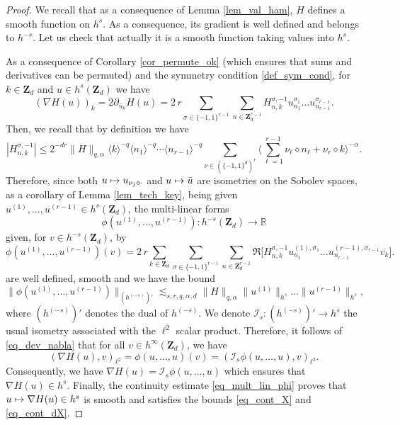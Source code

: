 \documentclass[JEP,XML,SOM,Unicode,NoEqCountersInSection,published]{cedram}
\newcommand\mto{\mathchoice{\longmapsto}{\mapsto}{\mapsto}{\mapsto}}
\theoremstyle{definition}
\begin{document}
\begin{proof} We recall that as a consequence of Lemma \ref{lem_val_ham}, $H$ defines a smooth function on $h^{s}$. As a consequence, its gradient is well defined and belongs to $h^{-s}$. Let us check that actually it is a smooth function taking values into $h^s$.

As a consequence of Corollary \ref{cor_permute_ok} (which ensures that sums and derivatives can be permuted) and the symmetry condition \eqref{def_sym_cond}, for $k\in \mathbf{Z}_d$ and $u \in h^s(\mathbf{Z}_d)$ we have
\begin{equation}
\label{eq_dev_nabla}
(\nabla H(u))_k = 2\partial_{\bar{u}_k} H(u) = 2\,r \sum_{\sigma \in \{-1,1\}^{r-1}} \sum_{n\in \mathbf{Z}_d^{r-1} } H_{n,k}^{\sigma,-1} u_{n_1}^{\sigma_1} \dots u_{n_{r-1}}^{\sigma_{r-1}}.
\end{equation}
Then, we recall that by definition we have
\[
|H_{n,k}^{\sigma,-1}| \leq 2^{-dr} \| H\|_{q,\alpha} \langle k \rangle^{-q} \langle n_1 \rangle^{-q} \cdots \langle n_{r-1} \rangle^{-q} \sum_{\nu \in (\{-1,1\}^d)^r} \biggl\langle \sum_{\ell =1}^{r-1} \nu_{\ell} \diamond n_{\ell} + \nu_{r} \diamond k \biggr\rangle^{-\alpha}.
\]
Therefore, since both $u\mto u_{\nu_j \diamond \cdot}$ and $u\mto \bar u$ are isometries on the Sobolev spaces, as a corollary of Lemma \ref{lem_tech_key}, being given $u^{(1)},\dots,u^{(r-1)}\in h^s(\mathbf{Z}_d)$, the multi-linear forms
\[
\phi(u^{(1)},\dots,u^{(r-1)}): h^{-s}(\mathbf{Z}_d) \to \mathbb{R}
\]
given, for $v\in h^{-s}(\mathbf{Z}_d)$, by
\[
\phi(u^{(1)},\dots,u^{(r-1)}) (v) = 2\,r \displaystyle \sum_{k\in \mathbf{Z}_d} \sum_{\sigma \in \{-1,1\}^{r-1}} \sum_{n\in \mathbf{Z}_d^{r-1} } \Re \bigl[H_{n,k}^{\sigma,-1} u_{n_1}^{(1),\sigma_1} \dots u_{n_{r-1}}^{(r-1),\sigma_{r-1}} \overline{v_k} \bigr].
\]
are well defined, smooth and we have the bound
\begin{equation}
\label{eq_mult_lin_phi}
\|\phi(u^{(1)},\dots,u^{(r-1)})\|_{(h^{(-s)})'} \lesssim_{s,r,q,\alpha,d} \| H\|_{q,\alpha} \| u^{(1)} \|_{h^s} \dots \| u^{(r-1)} \|_{h^s},
\end{equation}
where $(h^{(-s)})'$ denotes the dual of $h^{(-s)}$. We denote $\mathcal{I}_s:(h^{(-s)})'\to h^s $ the usual isometry associated with the $\ell^2$ scalar product.
Therefore, it follows of \eqref{eq_dev_nabla} that for all $v\in h^\infty(\mathbf{Z}_d)$, we have
\[
(\nabla H(u),v)_{\ell^2} = \phi(u,\dots,u)(v) = (\mathcal{I}_s \phi(u,\dots,u),v)_{\ell^2}.
\]
Consequently, we have $\nabla H(u)=\mathcal{I}_s \phi(u,\dots,u)$ which ensures that $\nabla H(u) \in h^s$. \hbox{Finally}, the continuity estimate \eqref{eq_mult_lin_phi} proves that $u\mto \nabla H(u)\in h^s$ is smooth and satisfies the bounds \eqref{eq_cont_X} and \eqref{eq_cont_dX}.
\end{proof}
\end{document}
